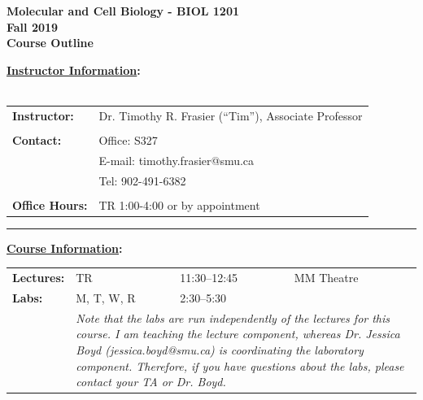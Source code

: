 \documentclass[hidelinks]{article}
\begin{document}
\vspace*{0.01cm}

\begin{center}
	\Large{\textbf{Molecular and Cell Biology  - BIOL 1201\\
	Fall 2019\\
	Course Outline}}
\end{center}


\textbf{\underline{Instructor Information}:}\\
\\
	\begin{tabular}{@{} p{2.3cm} l }
		\textbf{Instructor:}	& Dr. Timothy R. Frasier (``Tim''), Associate Professor\\
		\\
		\textbf{Contact:} 	& Office: S327\\
					& E-mail: timothy.frasier@smu.ca\\
					& Tel: 902-491-6382\\
		\\
		\textbf{Office Hours:} & TR 1:00-4:00 or by appointment				
	\end{tabular}

	\begin{center}
		\rule{4cm}{0.5pt}
	\end{center}


\textbf{\underline{Course Information}:}


	\begin{tabular}{@{} p{2.3cm} l l l}
		\textbf{Lectures:} & TR & 11:30--12:45 & MM Theatre\\
		\addlinespace
		\textbf{Labs:} & M, T, W, R & 2:30--5:30 &\\
			& \multicolumn{3}{p{14cm}}{\emph{Note that the labs are run independently of the lectures for this course. I am teaching the lecture component, whereas Dr. Jessica Boyd (jessica.boyd@smu.ca) is coordinating the laboratory component. Therefore, if you have questions about the labs, please contact your TA or Dr. Boyd.}}
	\end{tabular}
	
\end{document}

